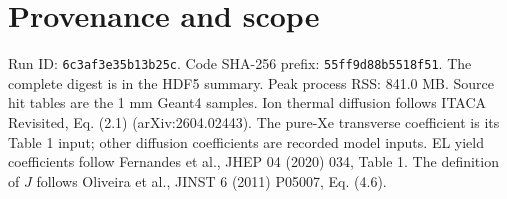 \documentclass[11pt]{article}
\begin{document}
\section*{Provenance and scope}
Run ID: \texttt{6c3af3e35b13b25c}. Code SHA-256 prefix: \texttt{55ff9d88b5518f51}. The complete digest is in the HDF5 summary.
Peak process RSS: 841.0 MB. Source hit tables are the 1 mm Geant4 samples.
Ion thermal diffusion follows ITACA Revisited, Eq. (2.1) (arXiv:2604.02443). The pure-Xe transverse coefficient is its Table 1 input; other diffusion coefficients are recorded model inputs. EL yield coefficients follow Fernandes et al., JHEP 04 (2020) 034, Table 1. The definition of $J$ follows Oliveira et al., JINST 6 (2011) P05007, Eq. (4.6).
\end{document}
